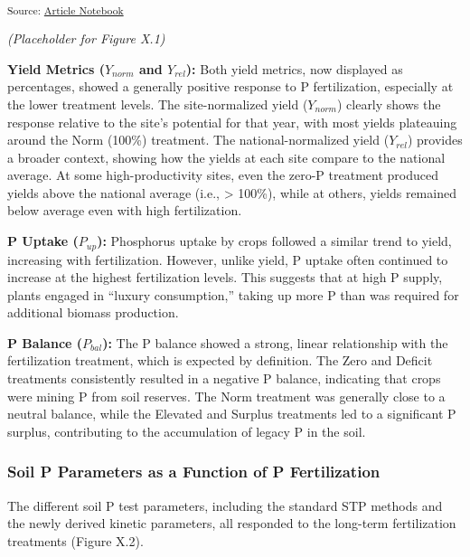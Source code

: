 \documentclass[
  a4paper,
]{article}
\begin{document}
\textsubscript{Source:
\href{https://Andrapodon.github.io/Master-Thesis-P-kinetics/index.qmd.html}{Article
Notebook}}

\emph{(Placeholder for Figure X.1)}

\textbf{Yield Metrics (\(Y_{norm}\) and \(Y_{rel}\)):} Both yield
metrics, now displayed as percentages, showed a generally positive
response to P fertilization, especially at the lower treatment levels.
The site-normalized yield (\(Y_{norm}\)) clearly shows the response
relative to the site's potential for that year, with most yields
plateauing around the Norm (100\%) treatment. The national-normalized
yield (\(Y_{rel}\)) provides a broader context, showing how the yields
at each site compare to the national average. At some high-productivity
sites, even the zero-P treatment produced yields above the national
average (i.e., \textgreater{} 100\%), while at others, yields remained
below average even with high fertilization.

\textbf{P Uptake (\(P_{up}\)):} Phosphorus uptake by crops followed a
similar trend to yield, increasing with fertilization. However, unlike
yield, P uptake often continued to increase at the highest fertilization
levels. This suggests that at high P supply, plants engaged in ``luxury
consumption,'' taking up more P than was required for additional biomass
production.

\textbf{P Balance (\(P_{bal}\)):} The P balance showed a strong, linear
relationship with the fertilization treatment, which is expected by
definition. The Zero and Deficit treatments consistently resulted in a
negative P balance, indicating that crops were mining P from soil
reserves. The Norm treatment was generally close to a neutral balance,
while the Elevated and Surplus treatments led to a significant P
surplus, contributing to the accumulation of legacy P in the soil.

\subsubsection{Soil P Parameters as a Function of P
Fertilization}\label{soil-p-parameters-as-a-function-of-p-fertilization}

The different soil P test parameters, including the standard STP methods
and the newly derived kinetic parameters, all responded to the long-term
fertilization treatments (Figure X.2).
\end{document}
